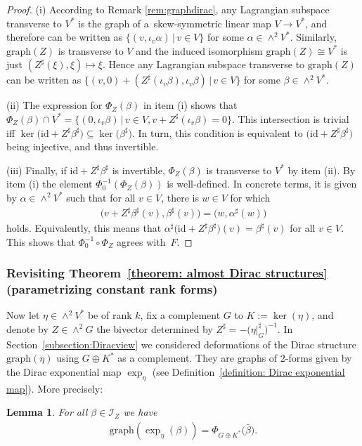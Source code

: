 \documentclass[10pt,a4paper]{amsart}
\numberwithin{equation}{section}
\newtheorem{Lemma}[Theorem]{Lemma}
\renewcommand{\graph}{\mathrm{graph}}
\renewcommand{\graph}{\mathrm{graph}}
\begin{document}
\begin{proof}(i) According to Remark \ref{rem:graphdirac}, any Lagrangian subspace transverse to $V^*$ is the graph of a~skew-symmetric linear map $V\to V^*$, and therefore can be written as $\{(v,\iota_v\alpha)\,|\,v\in V\}$ for some $\alpha\in \wedge^2 V^*$. Similarly, $\mathrm{graph}(Z)$ is transverse to $V$ and the induced isomorphism $\mathrm{graph}(Z)\cong V^*$ is just $(Z^\sharp(\xi),\xi)\mapsto \xi$. Hence any Lagrangian subspace transverse to $\mathrm{graph}(Z)$ can be written as $\{(v,0)+(Z^\sharp(\iota_v\beta),\iota_v\beta)\,|\,v\in V\}$ for some $\beta\in \wedge^2 V^*$.

(ii) The expression for $\Phi_Z(\beta)$ in item (i) shows that $\Phi_Z(\beta)\cap V^* =\{(0,\iota_v\beta)\,|\,v\in V, v+Z^\sharp(\iota_v\beta)=0\}$. This intersection is trivial if{f} $\ker\big(\mathrm{id} + Z^\sharp \beta^\sharp\big) \subseteq \ker\big(\beta^\sharp\big)$. In turn, this condition is equivalent to $\big(\mathrm{id} + Z^\sharp \beta^\sharp\big)$ being injective, and thus invertible.

(iii) Finally, if $\mathrm{id}+Z^\sharp\beta^\sharp$ is invertible, $\Phi_Z(\beta)$ is transverse to $V^*$ by item (ii). By item (i) the element $\Phi_0^{-1}(\Phi_Z(\beta))$ is well-defined. In concrete terms, {it is given by} $\alpha \in \wedge^2 V^*$ such that for all $v\in V$, there is $w \in V$ for which
\begin{gather*}\big(v + Z^\sharp \beta^\sharp(v),\beta^\sharp(v)\big)=\big(w,\alpha^\sharp(w)\big)\end{gather*}
holds. Equivalently, this means that $\alpha^\sharp\big(\mathrm{id}+Z^\sharp\beta^\sharp\big)(v)=\beta^\sharp(v)$ for all $v\in V$. This shows that $\Phi_0^{-1}\circ \Phi_Z$ agrees with~$F$.
\end{proof}

\subsubsection{{Revisiting Theorem~\ref{theorem: almost Dirac structures} (parametrizing constant rank forms)}}

Now let $\eta \in \wedge^2 V^*$ be of rank $k$, fix a complement $G$ to $K:=\ker(\eta)$, and denote by $Z \in \wedge^2 G$ the bivector determined by $ Z^\sharp=-\big(\eta\vert_G^\sharp\big)^{-1}$. In Section~\ref{subsection:Diracview} we considered deformations of the Dirac structure $\graph(\eta)$ using $G\oplus K^*$ as a complement. They are graphs of $2$-forms given by the Dirac exponential map $\exp_{\eta}$ (see Definition~\ref{definition: Dirac exponential map}). More precisely:
\begin{Lemma}\label{lemma:niceeq} For all $\beta\in \mathcal{I}_Z$ we have
\begin{gather}\label{eq:graphexp}
\mathrm{graph}(\exp_{\eta}(\beta))=\Phi_{G\oplus K^*}\big(\bar{\beta}\big).
\end{gather}
\end{Lemma}
\end{document}
